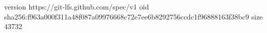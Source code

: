 version https://git-lfs.github.com/spec/v1
oid sha256:f963a000f311a48f087a09976668c72e7ee6b8292756ccdc1f96888163f38bc9
size 43732
